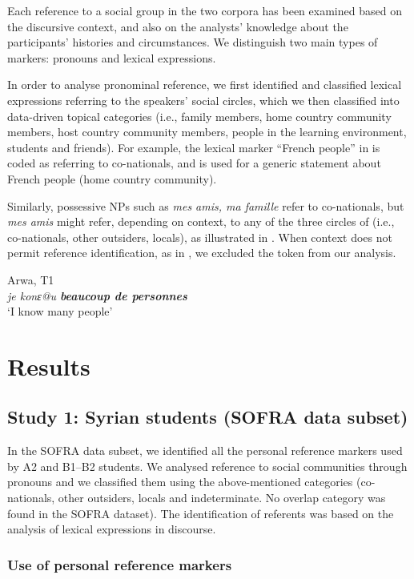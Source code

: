 \documentclass[output=paper]{langscibook}
\begin{document}
Each reference to a social group in the two corpora has been examined based on the discursive context, and also on the analysts’ knowledge about the participants’ histories and circumstances. We distinguish two main types of markers: pronouns and lexical expressions.

In order to analyse pronominal reference, we first identified and classified lexical expressions referring to the speakers’ social circles, which we then classified into data-driven topical categories (i.e., family members, home country community members, host country community members, people in the learning environment, students and friends). For example, the lexical marker “French people” in  is coded as referring to co-nationals, and is used for a generic statement about French people (home country community).

Similarly, possessive NPs such as \textit{mes amis, ma famille} refer to co-nationals, but \textit{mes amis} might refer, depending on context, to any of the three circles of  (i.e., co-nationals, other outsiders, locals), as illustrated in . When context does not permit reference identification, as in , we excluded the token from our analysis.

\ea%
\label{ex:5}
Arwa, T1\\
\textit{je konɛ@u \textbf{beaucoup de personnes}}\\
\glt `I know many people'
\z

\section{Results}\label{sec:saddour:3}

\subsection{Study 1: Syrian students (SOFRA data subset)}\label{sec:saddour:3.1}

In the SOFRA data subset, we identified all the personal reference markers used by A2 and B1–B2 students. We analysed reference to social communities through pronouns and we classified them using the above-mentioned categories (co-na\-tion\-als, other outsiders, locals and indeterminate. No overlap category was found in the SOFRA dataset). The identification of referents was based on the analysis of lexical expressions in discourse.

\subsubsection{Use of personal reference markers}\label{sec:saddour:3.1.1}
\end{document}
